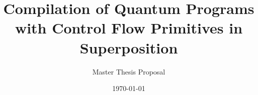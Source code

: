 \title{Compilation of Quantum Programs with Control Flow Primitives in Superposition}
\subtitle{Master Thesis \ifdefined\PROPOSAL{} Proposal \fi}
\date{\today}

\newcommand{\firstname}{Sascha}
\newcommand{\lastname}{Thiemann}
\newcommand{\matrNo}{406187}
\newcommand{\email}{sascha.thiemann@rwth-aachen.de}
\newcommand{\studyProgram}{Computer Science M.Sc.}

\newcommand{\firstsupervisor}{apl. Prof.\ Dr.\ Thomas Noll}
\newcommand{\firstsupervisorchair}{Chair for Software Modeling and Verification}
\newcommand{\firstsupervisoruniversity}{RWTH Aachen University}




